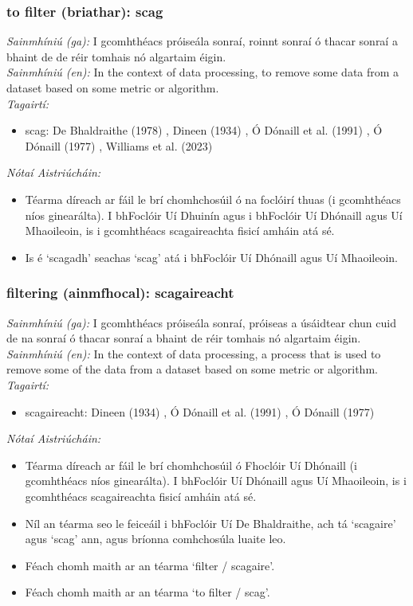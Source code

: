 \subsubsection*{to filter (briathar): scag}
 \noindent \textit{Sainmhíniú (ga):} I gcomhthéacs próiseála sonraí, roinnt sonraí ó thacar sonraí a bhaint de de réir tomhais nó algartaim éigin.
\\
 \noindent \textit{Sainmhíniú (en):} In the context of data processing, to remove some data from a dataset based on some metric or algorithm.
\\
 \noindent \textit{Tagairtí:}
\begin{itemize}
	\item scag: De Bhaldraithe (1978) \cite{de-bhaldraithe}, Dineen (1934) \cite{dineen}, Ó Dónaill et al. (1991) \cite{focloir-beag}, Ó Dónaill (1977) \cite{odonaill}, Williams et al. (2023) \cite{storchiste}
\end{itemize}

 \noindent \textit{Nótaí Aistriúcháin:}
\begin{itemize}
	\item Téarma díreach ar fáil le brí chomhchosúil ó na foclóirí thuas (i gcomhthéacs níos ginearálta). I bhFoclóir Uí Dhuinín agus i bhFoclóir Uí Dhónaill agus Uí Mhaoileoin, is i gcomhthéacs scagaireachta fisicí amháin atá sé.
	\item Is é `scagadh' seachas `scag' atá i bhFoclóir Uí Dhónaill agus Uí Mhaoileoin.
\end{itemize}


\subsubsection*{filtering (ainmfhocal): scagaireacht}
 \noindent \textit{Sainmhíniú (ga):} I gcomhthéacs próiseála sonraí, próiseas a úsáidtear chun cuid de na sonraí ó thacar sonraí a bhaint de réir tomhais nó algartaim éigin.
\\
 \noindent \textit{Sainmhíniú (en):} In the context of data processing, a process that is used to remove some of the data from a dataset based on some metric or algorithm.
\\
 \noindent \textit{Tagairtí:}
\begin{itemize}
	\item scagaireacht: Dineen (1934) \cite{dineen}, Ó Dónaill et al. (1991) \cite{focloir-beag}, Ó Dónaill (1977) \cite{odonaill}
\end{itemize}

 \noindent \textit{Nótaí Aistriúcháin:}
\begin{itemize}
	\item Téarma díreach ar fáil le brí chomhchosúil ó Fhoclóir Uí Dhónaill (i gcomhthéacs níos ginearálta). I bhFoclóir Uí Dhónaill agus Uí Mhaoileoin, is i gcomhthéacs scagaireachta fisicí amháin atá sé.
	\item Níl an téarma seo le feiceáil i bhFoclóir Uí De Bhaldraithe, ach tá `scagaire' agus `scag' ann, agus bríonna comhchosúla luaite leo.
	\item Féach chomh maith ar an téarma `filter  / scagaire'.
	\item Féach chomh maith ar an téarma `to filter / scag'.
\end{itemize}


